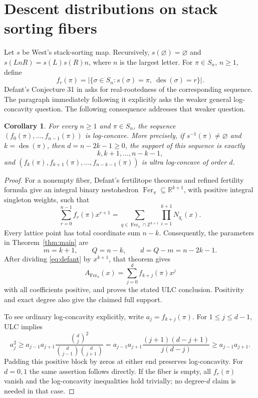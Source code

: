 \documentclass[11pt,letterpaper]{article}
\newtheorem{corollary}[theorem]{Corollary}
\theoremstyle{definition}
\theoremstyle{remark}
\newcommand{\ZZ}{\mathbb{Z}}
\newcommand{\RR}{\mathbb{R}}
\newcommand{\des}{\operatorname{des}}
\newcommand{\Fer}{\operatorname{Fer}}
\begin{document}
\section{Descent distributions on stack sorting fibers}\label{sec:fibers}
Let $s$ be West's stack-sorting map. Recursively, $s(\varnothing)=\varnothing$ and $s(LnR)=s(L)s(R)n$, where $n$ is the largest letter. For $\pi\in S_n$, $n\geq1$, define
\[
 f_r(\pi)=|\{\sigma\in S_n:s(\sigma)=\pi,\ \des(\sigma)=r\}|.
\]
Defant's Conjecture 31 in \cite[p.~37]{Defant2020} asks for real-rootedness of the corresponding sequence. The paragraph immediately following it explicitly asks the weaker general log-concavity question. The following consequence addresses that weaker question.

\begin{corollary}\label{cor:fibers}
For every $n\geq1$ and $\pi\in S_n$, the sequence
$(f_0(\pi),\ldots,f_{n-1}(\pi))$ is log-concave. More precisely, if $s^{-1}(\pi)\neq\varnothing$ and $k=\des(\pi)$, then $d=n-2k-1\geq0$, the support of this sequence is exactly
\[
 k,k+1,\ldots,n-k-1,
\]
and $(f_k(\pi),f_{k+1}(\pi),\ldots,f_{n-k-1}(\pi))$ is ultra log-concave of order $d$.
\end{corollary}
\begin{proof}
For a nonempty fiber, Defant's fertilitope theorems and refined fertility formula \cite[Theorems 3.1--3.2 and the following displayed formula]{Defant2023} give an integral binary nestohedron $\Fer_\pi\subseteq\RR^{k+1}$, with positive integral singleton weights, such that
\begin{equation}\label{eq:defant}
 \sum_{r=0}^{n-1}f_r(\pi)x^{r+1}
  =\sum_{q\in\Fer_\pi\cap\ZZ^{k+1}}\prod_{i=1}^{k+1}N_{q_i}(x).
\end{equation}
Every lattice point has total coordinate sum $n-k$. Consequently, the parameters in Theorem~\ref{thm:main} are
\[
 m=k+1,\qquad Q=n-k,\qquad d=Q-m=n-2k-1.
\]
After dividing \eqref{eq:defant} by $x^{k+1}$, that theorem gives
\[
 A_{\Fer_\pi}(x)=\sum_{j=0}^{d}f_{k+j}(\pi)x^j
\]
with all coefficients positive, and proves the stated ULC conclusion. Positivity and exact degree also give the claimed full support.

To see ordinary log-concavity explicitly, write $a_j=f_{k+j}(\pi)$. For $1\leq j\leq d-1$, ULC implies
\[
 a_j^2\geq a_{j-1}a_{j+1}
       \frac{\binom dj^2}{\binom d{j-1}\binom d{j+1}}
   =a_{j-1}a_{j+1}\frac{(j+1)(d-j+1)}{j(d-j)}
   \geq a_{j-1}a_{j+1}.
\]
Padding this positive block by zeros at either end preserves log-concavity. For $d=0,1$ the same assertion follows directly. If the fiber is empty, all $f_r(\pi)$ vanish and the log-concavity inequalities hold trivially; no degree-$d$ claim is needed in that case.
\end{proof}
\end{document}
